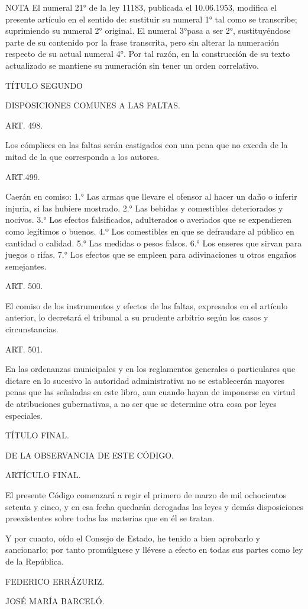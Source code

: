 NOTA
      El numeral 21° de la ley 11183, publicada el 10.06.1953, modifica el presente artículo en el sentido de: sustituir su numeral 1° tal como se transcribe; suprimiendo su numeral 2° original. El numeral 3°pasa a ser 2°, sustituyéndose parte de su contenido por la frase transcrita, pero sin alterar la numeración respecto de su actual numeral 4°. Por tal razón, en la construcción de su texto actualizado se mantiene su numeración sin tener un orden correlativo.

    TÍTULO SEGUNDO

    DISPOSICIONES COMUNES A LAS FALTAS.





    ART. 498.

    Los cómplices en las faltas serán castigados con una pena que no exceda de la mitad de la que corresponda a los autores.


    ART.499.

    Caerán en comiso:
    1.° Las armas que llevare el ofensor al hacer un daño o inferir injuria, si las hubiere mostrado.
    2.° Las bebidas y comestibles deteriorados y nocivos.
    3.° Los efectos falsificados, adulterados o averiados que se expendieren como legítimos o buenos.
    4.º Los comestibles en que se defraudare al público en cantidad o calidad.
    5.° Las medidas o pesos falsos.
    6.° Los enseres que sirvan para juegos o rifas.
    7.° Los efectos que se empleen para adivinaciones u otros engaños semejantes.


    ART. 500.

    El comiso de los instrumentos y efectos de las faltas, expresados en el artículo anterior, lo decretará el tribunal a su prudente arbitrio según los casos y circunstancias.



    ART. 501.

    En las ordenanzas municipales y en los reglamentos generales o particulares que dictare en lo sucesivo la autoridad administrativa no se establecerán mayores penas que las señaladas en este libro, aun cuando hayan de imponerse en virtud de atribuciones gubernativas, a no ser que se determine otra cosa por leyes especiales.


    TÍTULO FINAL.

    DE LA OBSERVANCIA DE ESTE CÓDIGO.





    ARTÍCULO FINAL.

    El presente Código comenzará a regir el primero de marzo de mil ochocientos setenta y cinco, y en esa fecha quedarán derogadas las leyes y demás disposiciones preexistentes sobre todas las materias que en él se tratan.


    Y por cuanto, oído el Consejo de Estado, he tenido a bien aprobarlo y sancionarlo; por tanto promúlguese y llévese a efecto en todas sus partes como ley de la República.

    FEDERICO ERRÁZURIZ.

    JOSÉ MARÍA BARCELÓ.